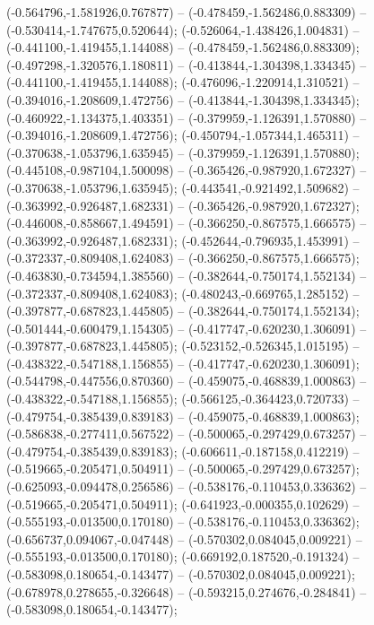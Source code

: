  (-0.564796,-1.581926,0.767877) -- (-0.478459,-1.562486,0.883309) -- (-0.530414,-1.747675,0.520644);
 (-0.526064,-1.438426,1.004831) -- (-0.441100,-1.419455,1.144088) -- (-0.478459,-1.562486,0.883309);
 (-0.497298,-1.320576,1.180811) -- (-0.413844,-1.304398,1.334345) -- (-0.441100,-1.419455,1.144088);
 (-0.476096,-1.220914,1.310521) -- (-0.394016,-1.208609,1.472756) -- (-0.413844,-1.304398,1.334345);
 (-0.460922,-1.134375,1.403351) -- (-0.379959,-1.126391,1.570880) -- (-0.394016,-1.208609,1.472756);
 (-0.450794,-1.057344,1.465311) -- (-0.370638,-1.053796,1.635945) -- (-0.379959,-1.126391,1.570880);
 (-0.445108,-0.987104,1.500098) -- (-0.365426,-0.987920,1.672327) -- (-0.370638,-1.053796,1.635945);
 (-0.443541,-0.921492,1.509682) -- (-0.363992,-0.926487,1.682331) -- (-0.365426,-0.987920,1.672327);
 (-0.446008,-0.858667,1.494591) -- (-0.366250,-0.867575,1.666575) -- (-0.363992,-0.926487,1.682331);
 (-0.452644,-0.796935,1.453991) -- (-0.372337,-0.809408,1.624083) -- (-0.366250,-0.867575,1.666575);
 (-0.463830,-0.734594,1.385560) -- (-0.382644,-0.750174,1.552134) -- (-0.372337,-0.809408,1.624083);
 (-0.480243,-0.669765,1.285152) -- (-0.397877,-0.687823,1.445805) -- (-0.382644,-0.750174,1.552134);
 (-0.501444,-0.600479,1.154305) -- (-0.417747,-0.620230,1.306091) -- (-0.397877,-0.687823,1.445805);
 (-0.523152,-0.526345,1.015195) -- (-0.438322,-0.547188,1.156855) -- (-0.417747,-0.620230,1.306091);
 (-0.544798,-0.447556,0.870360) -- (-0.459075,-0.468839,1.000863) -- (-0.438322,-0.547188,1.156855);
 (-0.566125,-0.364423,0.720733) -- (-0.479754,-0.385439,0.839183) -- (-0.459075,-0.468839,1.000863);
 (-0.586838,-0.277411,0.567522) -- (-0.500065,-0.297429,0.673257) -- (-0.479754,-0.385439,0.839183);
 (-0.606611,-0.187158,0.412219) -- (-0.519665,-0.205471,0.504911) -- (-0.500065,-0.297429,0.673257);
 (-0.625093,-0.094478,0.256586) -- (-0.538176,-0.110453,0.336362) -- (-0.519665,-0.205471,0.504911);
 (-0.641923,-0.000355,0.102629) -- (-0.555193,-0.013500,0.170180) -- (-0.538176,-0.110453,0.336362);
 (-0.656737,0.094067,-0.047448) -- (-0.570302,0.084045,0.009221) -- (-0.555193,-0.013500,0.170180);
 (-0.669192,0.187520,-0.191324) -- (-0.583098,0.180654,-0.143477) -- (-0.570302,0.084045,0.009221);
 (-0.678978,0.278655,-0.326648) -- (-0.593215,0.274676,-0.284841) -- (-0.583098,0.180654,-0.143477);
